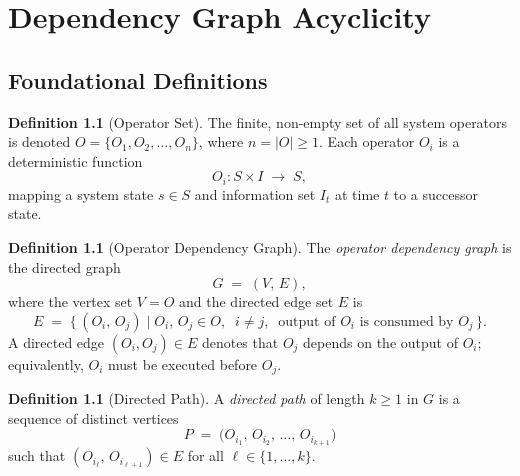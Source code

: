 \documentclass[12pt,openany]{book}
\newcommand{\calI}{\mathcal{I}}
\numberwithin{equation}{chapter}
\theoremstyle{plain}
\theoremstyle{definition}
\newtheorem{definition}[theorem]{Definition}
\theoremstyle{remark}
\numberwithin{equation}{chapter}
\theoremstyle{plain}
\newcommand{\calO}{\mathcal{O}}
\newcommand{\calS}{\mathcal{S}}
\def\calI{I}%
\def\calS{S}%
\def\calO{O}%
\begin{document}
\chapter{Dependency Graph Acyclicity}
\label{ch:dag}
\label{ch:correctness}

\section{Foundational Definitions}
\label{sec:dag-defs}

\begin{definition}[Operator Set]
\label{def:operator-set}
The finite, non-empty set of all system operators is denoted
$\calO = \{O_1, O_2, \ldots, O_n\}$, where $n = |\calO| \geq 1$.
Each operator $O_i$ is a deterministic function
\begin{equation}
  O_i : \calS \times \calI \;\longrightarrow\; \calS,
  \label{eq:operator-type}
\end{equation}
mapping a system state $s \in \calS$ and information set
$\calI_t$ at time $t$ to a successor state.
\end{definition}

\begin{definition}[Operator Dependency Graph]
\label{def:dep-graph}
The \emph{operator dependency graph} is the directed graph
\begin{equation}
  G \;=\; (V,\, E),
  \label{eq:dep-graph}
\end{equation}
where the vertex set $V = \calO$ and the directed edge set $E$ is
\begin{equation}
  E \;=\;
  \bigl\{\,(O_i,\, O_j) \;\big|\;
    O_i,\, O_j \in \calO,\;\; i \neq j,\;\;
    \text{output of } O_i \text{ is consumed by } O_j
  \,\bigr\}.
  \label{eq:edge-set}
\end{equation}
A directed edge $(O_i, O_j) \in E$ denotes that $O_j$ depends on the
output of $O_i$; equivalently, $O_i$ must be executed before $O_j$.
\end{definition}

\begin{definition}[Directed Path]
\label{def:directed-path}
A \emph{directed path} of length $k \geq 1$ in $G$ is a sequence of
distinct vertices
\begin{equation}
  P \;=\; \bigl(O_{i_1},\, O_{i_2},\, \ldots,\, O_{i_{k+1}}\bigr)
  \label{eq:directed-path}
\end{equation}
such that $(O_{i_\ell},\, O_{i_{\ell+1}}) \in E$ for all
$\ell \in \{1, \ldots, k\}$.
\end{definition}
\end{document}
